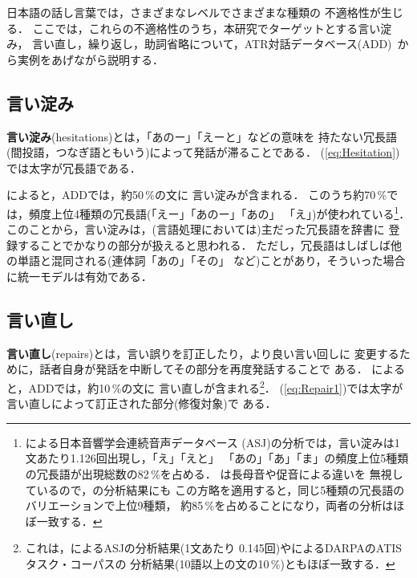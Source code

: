 日本語の話し言葉では，さまざまなレベルでさまざまな種類の
不適格性が生じる\cite{河原:情処-36-11-1027}．
ここでは，これらの不適格性のうち，本研究でターゲットとする言い淀み，
言い直し，繰り返し，助詞省略について，ATR対話データベース(ADD)\,
\cite{江原:ATR-TR-I-0186}から実例をあげながら説明する．

\subsection{言い淀み}\label{sec:Ill-formed:Hesitation}

{\bf 言い淀み}(hesitations)とは，「あのー」「えーと」などの意味を
持たない冗長語(間投語，つなぎ語ともいう)によって発話が滞ることである．
(\ref{eq:Hesitation})では太字が冗長語である．

によると，ADDでは，約50\,\%の文に
言い淀みが含まれる．
このうち約70\,\%では，頻度上位4種類の冗長語(「えー」「あのー」「あの」
「え」)が使われている\footnote{
  による日本音響学会連続音声データベース
(ASJ)の分析では，言い淀みは1文あたり1.126回出現し，「え」「えと」
「あの」「あ」「ま」の頻度上位5種類の冗長語が出現総数の82\,\%を占める．
\citeauthor{中川:音響-51-3-202}は長母音や促音による違いを
無視しているので，\citeauthor{村上:IEICE-SP-91-100-71}の分析結果にも
この方略を適用すると，同じ5種類の冗長語のバリエーションで上位9種類，
約85\,\%を占めることになり，両者の分析はほぼ一致する．
}．
このことから，言い淀みは，(言語処理においては)主だった冗長語を辞書に
登録することでかなりの部分が扱えると思われる．
ただし，冗長語はしばしば他の単語と混同される(連体詞「あの」「その」
など)ことがあり，そういった場合に統一モデルは有効である．

\subsection{言い直し}\label{sec:Ill-formed:Repair}

{\bf 言い直し}(repairs)とは，言い誤りを訂正したり，より良い言い回しに
変更するために，話者自身が発話を中断してその部分を再度発話することで
ある．
によると，ADDでは，約10\,\%の文に
言い直しが含まれる\footnote{
  これは，によるASJの分析結果(1文あたり
0.145回)やによるDARPAのATISタスク・コーパスの
分析結果(10語以上の文の10\,\%)ともほぼ一致する．
}．
(\ref{eq:Repair1})では太字が言い直しによって訂正された部分(修復対象)で
ある．

